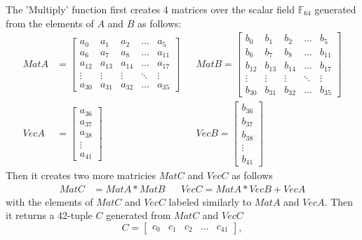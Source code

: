 \documentclass[12pt,letterpaper]{article}
\begin{document}
\begin{itemize}
        The 'Multiply' function first creates $4$ matrices over the scalar field $\mathbb{F}_{64}$ generated from the elements of $A$ and $B$ as follows:
        \begin{align*}
            MatA &= 
            \begin{bmatrix}
                a_{0}   & a_{1}     & a_{2}     &\dots      & a_{5} \\
                a_{6}   & a_{7}     & a_{8}     &\dots      & a_{11} \\
                a_{12}  & a_{13}    & a_{14}    &\dots      & a_{17} \\
                \vdots  &\vdots     &\vdots     &\ddots     &\vdots \\
                a_{30}  & a_{31}    & a_{32}    &\dots      & a_{35}
            \end{bmatrix}
            && MatB = 
            \begin{bmatrix}
                b_{0}   & b_{1}     & b_{2}     &\dots      & b_{5} \\
                b_{6}   & b_{7}     & b_{8}     &\dots      & b_{11} \\
                b_{12}  & b_{13}    & b_{14}    &\dots      & b_{17} \\
                \vdots  &\vdots     &\vdots     &\ddots     &\vdots \\
                b_{30}  & b_{31}    & b_{32}    &\dots      & b_{35}
            \end{bmatrix}\\
            VecA &=
            \begin{bmatrix}
                a_{36}\\
                a_{37}\\
                a_{38}\\
                \vdots\\
                a_{41}
            \end{bmatrix}
            &&VecB =
            \begin{bmatrix}
                b_{36}\\
                b_{37}\\
                b_{38}\\
                \vdots\\
                b_{41}
            \end{bmatrix}
        \end{align*}
        Then it creates two more matricies $MatC$ and $VecC$ as follows
        \begin{align*}
            MatC &= MatA*MatB  &&VecC=MatA*VecB + VecA
        \end{align*}
        with the elements of $MatC$ and $VecC$ labeled similarly to $MatA$ and $VecA$. Then it returns a 42-tuple $C$ generated from $MatC$ and $VecC$
        \begin{equation*}
            C = 
            \begin{bmatrix}
                c_{0}   & c_{1} & c_{2} & \dots & c_{41}
            \end{bmatrix},
        \end{equation*}
        

\end{itemize}
\end{document}
